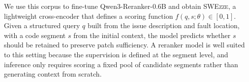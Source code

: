 \documentclass[sigconf,nonacm]{acmart}
\newcommand{\haoxiang}[1]{{\color{red}\textbf{(Haoxiang:} #1\textbf{)}}}
\newcommand{\projName}{\textsc{SWEzze}\xspace}
\begin{document}
We use this corpus to fine-tune Qwen3-Reranker-0.6B and obtain \projName, a lightweight cross-encoder that defines a scoring function $f(q, s; \theta) \in [0,1]$. Given a structured query $q$ built from the issue description and fault location, with a code segment $s$ from the initial context, the model predicts whether $s$ should be retained to preserve patch sufficiency. A reranker model is well suited to this setting because the supervision is defined at the segment level, and inference only requires scoring a fixed pool of candidate segments rather than generating context from scratch.



\end{document}
